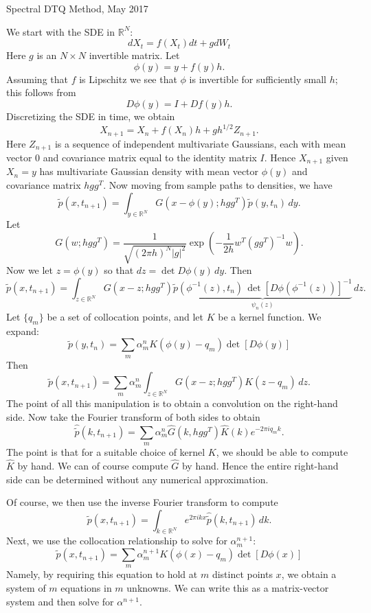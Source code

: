 \documentclass[12pt]{article}
\begin{document}
\begin{center}
Spectral DTQ Method, May 2017
\end{center}
We start with the SDE in $\mathbb{R}^N$:
$$
dX_t = f(X_t) dt + g dW_t
$$
Here $g$ is an $N \times N$ invertible matrix.
Let
$$
\phi(y) = y + f(y) h.
$$
Assuming that $f$ is Lipschitz we see that $\phi$ is invertible for sufficiently small $h$; this follows from
$$
D \phi(y) = I + Df(y) h.
$$
Discretizing the SDE in time, we obtain
$$
X_{n+1} = X_n + f(X_n) h + g h^{1/2} Z_{n+1}.
$$
Here $Z_{n+1}$ is a sequence of independent multivariate Gaussians, each
with mean vector $0$ and covariance matrix equal to the identity matrix $I$.
Hence $X_{n+1}$ given $X_n = y$ has multivariate Gaussian density with mean
vector $\phi(y)$ and covariance matrix $h g g^T$.
Now moving from sample paths to densities, we have
$$
\widetilde{p}(x,t_{n+1}) = \int_{y \in \mathbb{R}^N} G(x - \phi(y);h g g^T) \widetilde{p}(y,t_n) \, dy.
$$
Let
$$
G(w;h g g^T) = \frac{1}{\sqrt{ (2 \pi h)^N |g|^2 }} \exp \left( -\frac{1}{2h} w^T (g g^T)^{-1} w \right).
$$
Now we let $z = \phi(y)$ so that $dz = \det D\phi(y) \, dy$.  Then
$$
\widetilde{p}(x,t_{n+1}) = \int_{z \in \mathbb{R}^N} G(x - z; h g g^T) \underbrace{\widetilde{p}(\phi^{-1}(z),t_n) \, \det [D\phi(\phi^{-1}(z))]^{-1}}_{\psi_n(z)} \, dz.
$$
Let $\{q_m\}$ be a set of collocation points, and let $K$ be a kernel function.  We expand:
$$
\widetilde{p}(y, t_n) = \sum_m \alpha_m^n K(\phi(y) - q_m) \det [D\phi(y)] 
$$
Then
$$
\widetilde{p}(x, t_{n+1}) = \sum_m \alpha_m^n \int_{z \in \mathbb{R}^N} G(x - z; h g g^T) K(z - q_m) \, dz.
$$
The point of all this manipulation is to obtain a convolution on the right-hand side.  Now take the Fourier transform of both sides to obtain
$$
\widehat{\widetilde{p}}(k, t_{n+1}) = \sum_m \alpha_m^n \widehat{G}(k,hgg^T) \widehat{K}(k) e^{-2 \pi i q_m k}.
$$
The point is that for a suitable choice of kernel $K$, we should be able to compute $\widehat{K}$ by hand.  We can of course compute $\widehat{G}$ by hand.  Hence the entire right-hand side can be determined without any numerical approximation.

Of course, we then use the inverse Fourier transform to compute
$$
\widetilde{p}(x, t_{n+1}) = \int_{k \in \mathbb{R}^N} e^{2 \pi i k x} \widehat{\widetilde{p}}(k, t_{n+1}) \, dk.
$$
Next, we use the collocation relationship to solve for $\alpha_m^{n+1}$:
$$
\widetilde{p}(x, t_{n+1}) = \sum_m \alpha_m^{n+1} K(\phi(x) - q_m) \det [D\phi(x)] 
$$
Namely, by requiring this equation to hold at $m$ distinct points $x$, we obtain a system of $m$ equations in $m$ unknowns.  We can write this as a matrix-vector system and then solve for $\alpha^{n+1}$.
\end{document}
